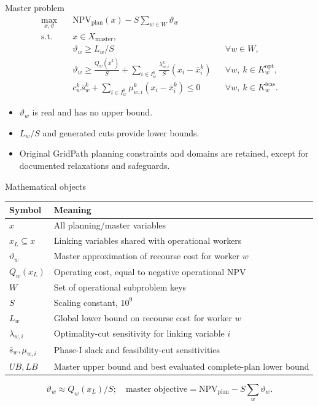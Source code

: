 \documentclass[aspectratio=169,10pt]{beamer}
\begin{document}
\begin{frame}{Master problem}
\small
\[
\begin{aligned}
\max_{x,\vartheta}\quad&
\mathrm{NPV}_{\mathrm{plan}}(x)-S\sum_{w\in W}\vartheta_w\\
\text{s.t.}\quad&x\in X_{\mathrm{master}},\\
&\vartheta_w\geq L_w/S &&\forall w\in W,\\
&\vartheta_w\geq \frac{Q_w(\bar{x}^{k})}{S}
+\sum_{i\in I_w^k}\frac{\lambda_{w,i}^{k}}{S}(x_i-\bar{x}_i^k)
&&\forall w,\ k\in K_w^{\mathrm{opt}},\\
&c_w^k\bar{s}_w^k+\sum_{i\in I_w^k}\mu_{w,i}^k(x_i-\bar{x}_i^k)\leq0
&&\forall w,\ k\in K_w^{\mathrm{feas}}.
\end{aligned}
\]
\begin{itemize}
\item $\vartheta_w$ is real and has no upper bound.
\item $L_w/S$ and generated cuts provide lower bounds.
\item Original GridPath planning constraints and domains are retained, except for documented relaxations and safeguards.
\end{itemize}
\end{frame}

\begin{frame}{Mathematical objects}
\small
\begin{tabular}{@{}ll@{}}
\toprule Symbol & Meaning\\\midrule
$x$ & All planning/master variables\\
$x_L\subseteq x$ & Linking variables shared with operational workers\\
$\vartheta_w$ & Master approximation of recourse cost for worker $w$\\
$Q_w(x_L)$ & Operating cost, equal to negative operational NPV\\
$W$ & Set of operational subproblem keys\\
$S$ & Scaling constant, $10^9$\\
$L_w$ & Global lower bound on recourse cost for worker $w$\\
$\lambda_{w,i}$ & Optimality-cut sensitivity for linking variable $i$\\
$\bar{s}_w,\mu_{w,i}$ & Phase-I slack and feasibility-cut sensitivities\\
$UB,LB$ & Master upper bound and best evaluated complete-plan lower bound\\
\bottomrule
\end{tabular}
\[
\vartheta_w\approx Q_w(x_L)/S;\quad
\text{master objective}=\mathrm{NPV}_{\mathrm{plan}}-S\sum_w\vartheta_w.
\]
\end{frame}
\end{document}
